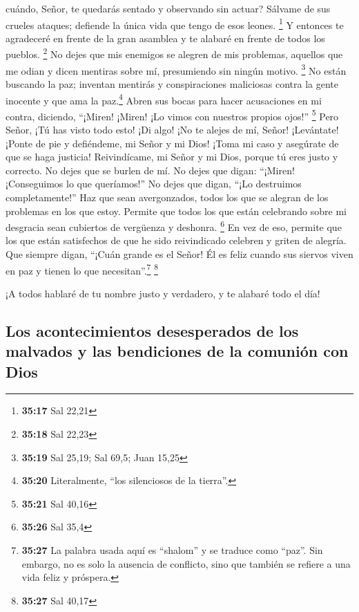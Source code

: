 cuándo, Señor, te quedarás sentado y observando sin actuar? Sálvame de
sus crueles ataques; defiende la única vida que tengo de esos leones.
\footnote{\textbf{35:17} Sal 22,21}  Y entonces te
agradeceré en frente de la gran asamblea y te alabaré en frente de todos
los pueblos. \footnote{\textbf{35:18} Sal 22,23}  No
dejes que mis enemigos se alegren de mis problemas, aquellos que me
odian y dicen mentiras sobre mí, presumiendo sin ningún motivo.
\footnote{\textbf{35:19} Sal 25,19; Sal 69,5; Juan 15,25}
 No están buscando la paz; inventan mentirás y
conspiraciones maliciosas contra la gente inocente y que ama la
paz.\footnote{\textbf{35:20} Literalmente, ``los silenciosos de la
  tierra''.}  Abren sus bocas para hacer acusaciones en
mi contra, diciendo, ``¡Miren! ¡Miren! ¡Lo vimos con nuestros propios
ojos!'' \footnote{\textbf{35:21} Sal 40,16}  Pero Señor,
¡Tú has visto todo esto! ¡Di algo! ¡No te alejes de mí, Señor!
 ¡Levántate! ¡Ponte de pie y defiéndeme, mi Señor y mi
Dios! ¡Toma mi caso y asegúrate de que se haga justicia! 
Reivindícame, mi Señor y mi Dios, porque tú eres justo y correcto. No
dejes que se burlen de mí.  No dejes que digan: ``¡Miren!
¡Conseguimos lo que queríamos!'' No dejes que digan, ``¡Lo destruimos
completamente!''  Haz que sean avergonzados, todos los
que se alegran de los problemas en los que estoy. Permite que todos los
que están celebrando sobre mi desgracia sean cubiertos de vergüenza y
deshonra. \footnote{\textbf{35:26} Sal 35,4}  En vez de
eso, permite que los que están satisfechos de que he sido reivindicado
celebren y griten de alegría. Que siempre digan, ``¡Cuán grande es el
Señor! Él es feliz cuando sus siervos viven en paz y tienen lo que
necesitan''.\footnote{\textbf{35:27} La palabra usada aquí es ``shalom''
  y se traduce como ``paz''. Sin embargo, no es solo la ausencia de
  conflicto, sino que también se refiere a una vida feliz y próspera.}
\footnote{\textbf{35:27} Sal 40,17}

 ¡A todos hablaré de tu nombre justo y verdadero, y te
alabaré todo el día!

\hypertarget{los-acontecimientos-desesperados-de-los-malvados-y-las-bendiciones-de-la-comuniuxf3n-con-dios}{%
\subsection{Los acontecimientos desesperados de los malvados y las
bendiciones de la comunión con
Dios}\label{los-acontecimientos-desesperados-de-los-malvados-y-las-bendiciones-de-la-comuniuxf3n-con-dios}}

